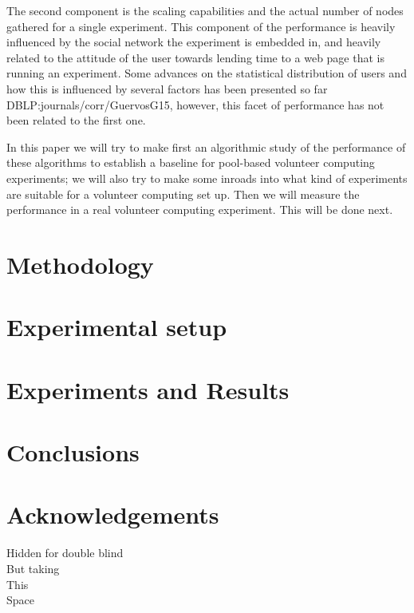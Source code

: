 \documentclass[runningheads,a4paper]{llncs}
\begin{document}
The second component is the scaling capabilities and the actual number %
of nodes gathered for a single experiment. This component of the
performance is heavily influenced by the social network the experiment
is embedded in, and heavily related to the attitude of the user
towards lending time to a web page that is running an experiment. Some
advances on the statistical distribution of users and how this is
influenced by several factors has been presented so far
DBLP:journals/corr/GuervosG15, however, this facet of performance has
not been related to the first one.

In this paper we will try to make first an algorithmic study of the
performance of these algorithms to establish a baseline for pool-based
volunteer
computing experiments; we will also try to make some inroads into what
kind of experiments are suitable for a volunteer computing set
up. Then we will measure the performance in a real volunteer computing
experiment. This will be done next. 


\section{Methodology} 
\label{sec:met}


\section{Experimental setup}
\label{sec:exp}



\section{Experiments and Results}
\label{sec:res}





\section{Conclusions}

\section*{Acknowledgements}

Hidden for double blind\\
But taking\\
This\\
Space




\end{document}
